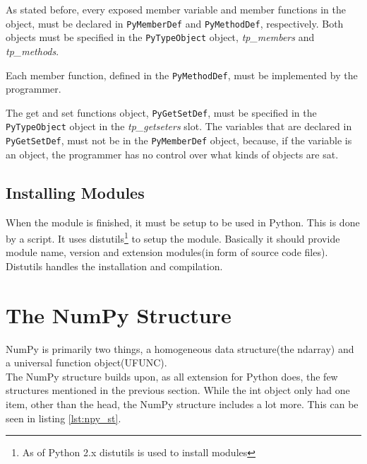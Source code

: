 As stated before, every exposed member variable and member functions
in the object, must be declared in \texttt{PyMemberDef} and
\texttt{PyMethodDef}, respectively. Both objects must be specified in the
\texttt{PyTypeObject} object, \textit{tp\_members} and
\textit{tp\_methods}.

Each member function, defined in the \texttt{PyMethodDef}, must be
implemented by the programmer.

The get and set functions object, \texttt{PyGetSetDef}, must be
specified in the \texttt{PyTypeObject} object in the
\textit{tp\_getseters} slot. The variables that are declared in
\texttt{PyGetSetDef}, must not be in the \texttt{PyMemberDef} object,
because, if the variable is an object, the programmer has no control
over what kinds of objects are sat.



\subsection{Installing Modules}

When the module is finished, it must be setup to be used in
Python. This is done by a  script. It uses
distutils\footnote{As of Python 2.x distutils is used to install
modules} to setup the module. Basically it should provide module name,
version and extension modules(in form of source code files). Distutils
handles the installation and compilation.

\section{The NumPy Structure}
\label{sec:python-numpy}

NumPy is primarily two things, a homogeneous data structure(the
ndarray) and a universal function object(UFUNC). \\

The NumPy structure builds upon, as all extension for Python does, the
few structures mentioned in the previous section. While the int object
only had one item, other than the head, the NumPy  structure
includes a lot more. This can be seen in listing \ref{lst:npy_st}.

